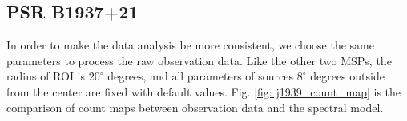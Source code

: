 \documentclass[12pt]{report}
\newcommand{\mycaption}[1]{\protect \caption{#1}}
\begin{document}
      
        \subsection{PSR B1937+21}
          In order to make the data analysis be more consistent, we choose the same parameters
          to process the raw observation data. Like the other two MSPs, the radius of ROI is $20^{\circ}$ 
          degrees, and all parameters of sources $8^{\circ}$ degrees outside from the center 
          are fixed with default values. Fig. \ref{fig: j1939_count_map} is the 
          comparison of count maps between observation data and the spectral model. 
\end{document}
